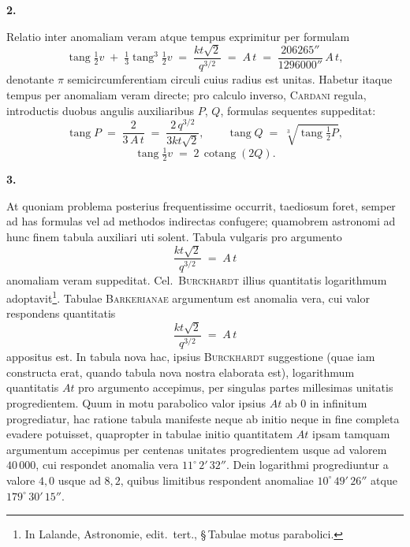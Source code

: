 \documentclass[11pt,a4paper]{article}
\newcommand{\tang}{\operatorname{tang}}
\newcommand{\cotang}{\operatorname{cotang}}
\begin{document}
\medskip

\begin{center}\textbf{2.}\end{center}

Relatio inter anomaliam veram atque tempus exprimitur per formulam
\[
  \tang\tfrac{1}{2}v \;+\; \tfrac{1}{3}\tang^{3}\!\tfrac{1}{2}v
   \;=\; \frac{kt\sqrt{2}}{q^{3/2}} \;=\; A\,t
   \;=\; \frac{206265''}{1296000''}\,A\,t,
\]
denotante $\pi$ semicircumferentiam circuli cuius radius est unitas.
Habetur itaque tempus per anomaliam veram directe; pro calculo inverso,
\textsc{Cardani} regula, introductis duobus angulis auxiliaribus $P$, $Q$,
formulas sequentes suppeditat:
\[
  \tang P \;=\; \frac{2}{3\,A\,t} \;=\; \frac{2\,q^{3/2}}{3 k t \sqrt{2}},
  \qquad
  \tang Q \;=\; \sqrt[3]{\tang\!\tfrac{1}{2} P},
\]
\[
  \tang\!\tfrac{1}{2} v \;=\; 2\,\cotang(2 Q).
\]

\medskip

\begin{center}\textbf{3.}\end{center}

At quoniam problema posterius frequentissime occurrit, taediosum foret,
semper ad has formulas vel ad methodos indirectas confugere; quamobrem
astronomi ad hunc finem tabula auxiliari uti solent. Tabula vulgaris pro
argumento
\[
  \frac{k t \sqrt{2}}{q^{3/2}} \;=\; A\,t
\]
anomaliam veram suppeditat. Cel.~\textsc{Burckhardt} illius quantitatis
logarithmum adoptavit\footnote{In Lalande, Astronomie, edit.~tert.,
\S\,Tabulae motus parabolici.}. Tabulae \textsc{Barkerianae} argumentum
est anomalia vera, cui valor respondens quantitatis
\[
  \frac{k t \sqrt{2}}{q^{3/2}} \;=\; A\,t
\]
appositus est. In tabula nova hac, ipsius \textsc{Burckhardt}
suggestione (quae iam constructa erat, quando tabula nova nostra
elaborata est), logarithmum quantitatis $A t$ pro argumento accepimus,
per singulas partes millesimas unitatis progredientem. Quum in motu
parabolico valor ipsius $A t$ ab $0$ in infinitum progrediatur, hac
ratione tabula manifeste neque ab initio neque in fine completa
evadere potuisset, quapropter in tabulae initio quantitatem $A t$ ipsam
tamquam argumentum accepimus per centenas unitates progredientem usque
ad valorem $40\,000$, cui respondet anomalia vera
$11^{\circ}\,2'\,32''$.
Dein logarithmi progrediuntur a valore $4{,}0$ usque ad $8{,}2$,
quibus limitibus respondent anomaliae $10^{\circ}\,49'\,26''$ atque
$179^{\circ}\,30'\,15''$.

\medskip

\end{document}
